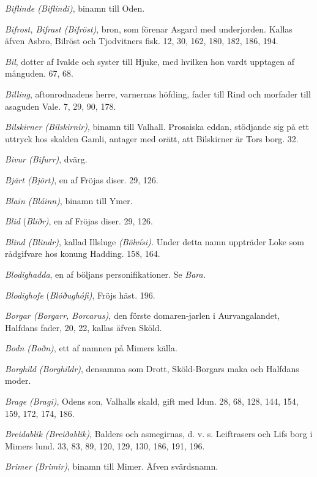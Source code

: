 \emph{Biflinde (Biflindi)}, binamn till Oden.

\emph{Bifrost, Bifrast (Bifröst)}, bron, som förenar Asgard med
underjorden. Kallas äfven Asbro, Bilröst och Tjodvitners fisk. 12, 30,
162, 180, 182, 186, 194.

\emph{Bil}, dotter af Ivalde och syster till Hjuke, med hvilken hon
vardt upptagen af månguden. 67, 68.

\emph{Billing}, aftonrodnadens herre, varnernas höfding, fader till Rind
och morfader till asaguden Vale. 7, 29, 90, 178.

\emph{Bilskirner (Bilskirnir)}, binamn till Valhall. Prosaiska eddan,
stödjande sig på ett uttryck hos skalden Gamli, antager med orätt, att
Bilskirner är Tors borg. 32.

\emph{Bivur (Bifurr)}, dvärg.

\emph{Bjärt (Björt)}, en af Fröjas diser. 29, 126.

\emph{Blain (Bláinn)}, binamn till Ymer.

\emph{Blid} (\emph{Bliðr)}, en af Fröjas diser. 29, 126.

\emph{Blind (Blindr)}, kallad Illsluge \emph{(Bölvísi).} Under detta
namn uppträder Loke som rådgifvare hos konung Hadding. 158, 164.

\emph{Blodighadda}, en af böljans personifikationer. Se \emph{Bara.}

\emph{Blodighofe} (\emph{Blóðughófi)}, Fröjs häst. 196.

\emph{Borgar (Borgarr, Borcarus)}, den förste domaren-jarlen i
Aurvangalandet, Halfdans fader, 20, 22, kallas äfven Sköld.

\emph{Bodn (Boðn)}, ett af namnen på Mimers källa.

\emph{Borghild (Borghildr)}, densamma som Drott, Sköld-Borgars maka och
Halfdans moder.

\protect\hypertarget{lb1625905.xhtmlux5cux23start209}{}{}\protect\hypertarget{lb1625905.xhtmlux5cux23start209-a}{}{}\protect\hypertarget{lb1625905.xhtmlux5cux23start209-b}{}{}\protect\hypertarget{lb1625905.xhtmlux5cux23start209-c}{}{}\protect\hypertarget{lb1625905.xhtmlux5cux23start209-d}{}{}

\emph{Brage (Bragi)}, Odens son, Valhalls skald, gift med Idun. 28, 68,
128, 144, 154, 159, 172, 174, 186.

\emph{Breidablik (Breiðablik)}, Balders och asmegirnas, d. v. s.
Leiftrasers och Lifs borg i Mimers lund. 33, 83, 89, 120, 129, 130, 186,
191, 196.

\emph{Brimer (Brimir)}, binamn till Mimer. Äfven svärdsnamn.

